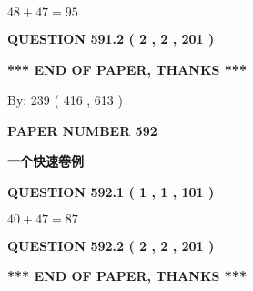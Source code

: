 \documentclass{ctexart}
\begin{document}
  
 
 

$ %
48 +  %
47=   %
95$
 
 
  
\vspace{0.2in}
  
{\textbf{\Large{QUESTION
591.2 
 ( 2 , 2 , 201 )
}}}
  
  
   
   
 \vspace{0.2in}
 
   
   
   
   
\vspace{1.0in} 
{\textbf{\large{ *** END OF PAPER, THANKS *** }}} 
   
   
\hspace{1.0in} By: 
 239 ( 416 ,  613 )
   
   
   
   
\newpage 
\setcounter{page}{ 
   592001 } 
   
   
   
   
 {\textbf{ \Large{ PAPER NUMBER  592  }}}
   
   
\vspace{0.2in}
   
   
   
   
   
   
 \vspace{0.2in}
{\LARGE {\textbf{ 一个快速卷例}}}
   
   
  
\vspace{0.2in}
  
{\textbf{\Large{QUESTION
592.1 
 ( 1 , 1 , 101 )
}}}
  
  
 
 

$ %
40 +  %
47=   %
87$
 
 
  
\vspace{0.2in}
  
{\textbf{\Large{QUESTION
592.2 
 ( 2 , 2 , 201 )
}}}
  
  
   
   
 \vspace{0.2in}
 
   
   
   
   
\vspace{1.0in} 
{\textbf{\large{ *** END OF PAPER, THANKS *** }}} 
   
\end{document}
